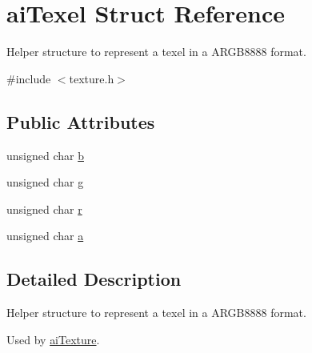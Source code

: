 \hypertarget{structai_texel}{\section{ai\-Texel Struct Reference}
\label{structai_texel}
}


Helper structure to represent a texel in a A\-R\-G\-B8888 format.  




{\ttfamily \#include $<$texture.\-h$>$}

\subsection*{Public Attributes}
\begin{DoxyCompactItemize}
\item 
unsigned char \hyperlink{structai_texel_a5b4f97f69cf59cb9065af67389599ba6}{b}
\item 
unsigned char \hyperlink{structai_texel_a41da3516b8241165e4ca58ea8ed68fe6}{g}
\item 
unsigned char \hyperlink{structai_texel_ae9408c0d18f6ff597715cc626398a0ff}{r}
\item 
unsigned char \hyperlink{structai_texel_a6d4450e83b02b29d24f7aab27958034e}{a}
\end{DoxyCompactItemize}


\subsection{Detailed Description}
Helper structure to represent a texel in a A\-R\-G\-B8888 format. 

Used by \hyperlink{structai_texture}{ai\-Texture}. 

